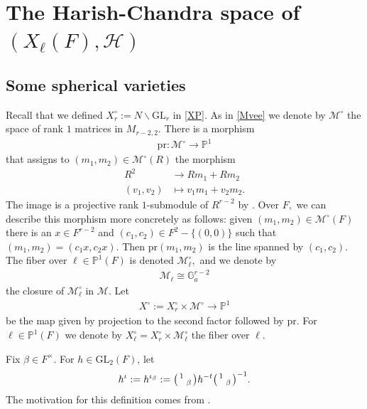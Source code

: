 \documentclass[12pt]{amsart}
\theoremstyle{remark}
\numberwithin{equation}{section}
\newcommand{\GL}{\mathrm{GL}}
\newcommand{\lto}{\longrightarrow}
\newcommand{\GG}{\mathbb{G}}
\theoremstyle{definition}
\newenvironment{psmatrix}
  {\left(\begin{smallmatrix}}
  {\end{smallmatrix}\right)}
\numberwithin{equation}{subsection}
\begin{document}
\section{The Harish-Chandra space of $(X_\ell(F),\mathcal{H})$}\label{sec:HC-X_ell}

\subsection{Some spherical varieties} Recall that we
defined $X_r^\circ:=N \backslash \GL_r$ in \eqref{XP}.  As in \eqref{Mvee} we denote by $\mathcal{M}^\circ$ the space of rank $1$ matrices in $M_{r-2,2}.$ 
There is a morphism
\begin{align*} 
  \mathrm{pr}: \mathcal{M}^{\circ} \lto \mathbb{P}^1
\end{align*}
that assigns to $(m_1,m_2) \in \mathcal{M}^{\circ}(R)$ the  morphism 
\begin{align*}
R^2 &\lto Rm_1+Rm_2 \\
   (v_1,v_2) &\longmapsto v_1m_1+v_2m_2.
\end{align*}
The image is a projective rank $1$-submodule of $R^{r-2}$ by 
\cite[Lemma 16.17]{Gortz_Wedhorn}.
Over $F,$ we can describe this morphism more concretely as follows: given $(m_1,m_2) \in \mathcal{M}^{\circ}(F)$ there is an $x \in F^{r-2}$ and $(c_1,c_2) \in F^2-\{(0,0)\}$ such that $(m_1,m_2)=(c_1x,c_2x).$  Then $\mathrm{pr}(m_1,m_2)$ is the line spanned by $(c_1,c_2).$  The fiber over $\ell \in \mathbb{P}^1(F)$ is denoted $\mathcal{M}_{\ell}^\circ,$ and we denote by 
\begin{align}\label{Mell}
\mathcal{M}_{\ell} \cong \GG_a^{r-2}
\end{align}
the closure of $\mathcal{M}_{\ell}^\circ$ in $\mathcal{M}.$  
Let
\begin{align} \label{Plperp}
X^\circ:=X_r^\circ \times \mathcal{M}^\circ \lto \mathbb{P}^1
\end{align}
be the map given by projection to the second factor followed by $\mathrm{pr}.$  For $\ell \in \mathbb{P}^1(F)$ we denote by $X_{\ell}^\circ=X_r^\circ \times \mathcal{M}_{\ell}^\circ$ the fiber over $\ell$.

Fix $\beta \in F^\times.$  For $h\in \GL_2(F)$, let 
\begin{align} \label{iota}
    h^{\iota}:=h^{\iota_{\beta}}:=\begin{psmatrix} 1 & \\& \beta \end{psmatrix}h^{-t}\begin{psmatrix} 1 & \\& \beta \end{psmatrix}^{-1}.
\end{align}
The motivation for this definition comes from \cite{GGHL}.
\end{document}

